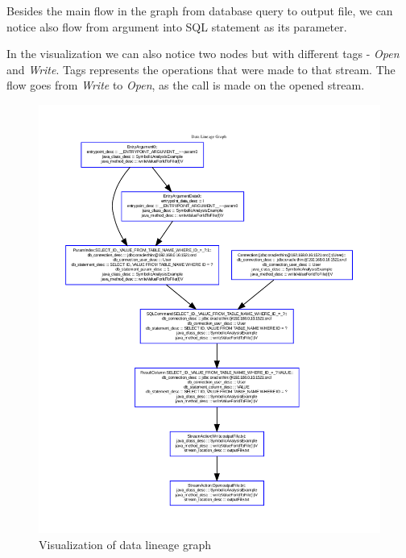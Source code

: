 Besides the main flow in the graph from database query to output file, we can
notice also flow from  argument into SQL statement as its parameter.

In the visualization we can also notice two  nodes but with different
tags - \textit{Open} and \textit{Write}.
Tags represents the operations that were made to that stream. The flow
goes from \textit{Write} to \textit{Open}, as the  call is made on the opened stream.

\begin{figure}[p]
  \includegraphics[trim={1cm 1cm 1cm 1.8cm},clip,width=\textwidth]{img/Examples2-writeValueForIdToFile.pdf}
  \caption{Visualization of data lineage graph}
  \label{frameworks:dbio:graph}
  \hspace{-15mm}
\end{figure}

